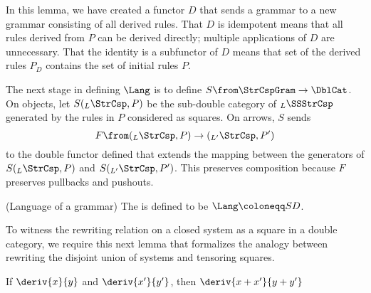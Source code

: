 In this lemma, we have created a functor $ D $ that sends a
grammar to a new grammar consisting of
all derived rules.  That $ D $ is idempotent means that all
rules derived from $ P $ can be derived directly; multiple
applications of $ D $ are unnecessary.  That the identity is
a subfunctor of $ D $ means that set of the derived rules
$ P_D $ contains the set of initial rules $ P $.

The next stage in defining $ \Lang $ is to define
$ S \from \StrCspGram \to \DblCat $. On objects, let
$ S ( _L \StrCsp , P ) $ be the sub-double category of
$ _L \SSStrCsp $ generated by the rules in $ P $ considered
as squares.  On arrows, $ S $ sends
\[
  F \from ( _{L}\StrCsp , P ) \to ( _{L'} \StrCsp , P' )
\]
to the double functor defined that extends the mapping
between the generators of $ S ( _{L}\StrCsp , P ) $ and
$ S ( _{L'}\StrCsp , P' ) $.  This preserves composition because
$ F $ preserves pullbacks and pushouts. 

\begin{definition}(Language of a grammar)
  The  is defined to be
  $ \Lang \coloneqq SD $. 
\end{definition}

To witness the rewriting relation on a closed system as a
square in a double category, we require this next lemma
that formalizes the analogy between rewriting the disjoint
union of systems and tensoring squares.

\begin{lemma} \label{thm:rewrite-rel-is-additive}
  If $ \deriv{x}{y} $ and $ \deriv{x'}{y'} $, then
  $ \deriv{x+x'}{y+y'} $
\end{lemma}

